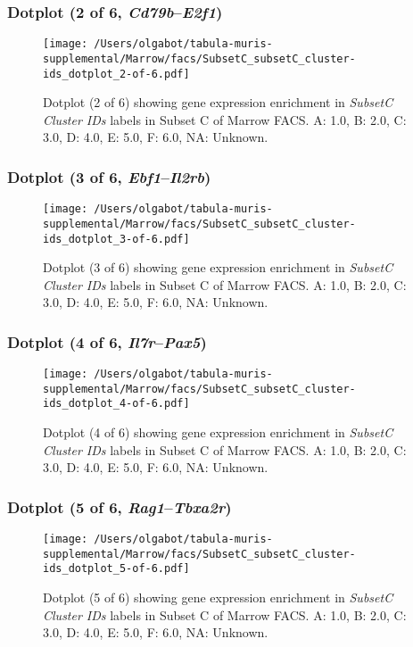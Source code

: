 \clearpage

\subsubsection{Dotplot (2 of 6, \emph{Cd79b}--\emph{E2f1})}
\begin{figure}[h]
\centering
\texttt{[image: /Users/olgabot/tabula-muris-supplemental/Marrow/facs/SubsetC\_subsetC\_cluster-ids\_dotplot\_2-of-6.pdf]}

\caption{ Dotplot (2 of 6)  showing gene expression enrichment in \emph{SubsetC Cluster IDs} labels in Subset C of Marrow FACS. A: 1.0, B: 2.0, C: 3.0, D: 4.0, E: 5.0, F: 6.0, NA: Unknown.}
\end{figure}


\clearpage

\subsubsection{Dotplot (3 of 6, \emph{Ebf1}--\emph{Il2rb})}
\begin{figure}[h]
\centering
\texttt{[image: /Users/olgabot/tabula-muris-supplemental/Marrow/facs/SubsetC\_subsetC\_cluster-ids\_dotplot\_3-of-6.pdf]}

\caption{ Dotplot (3 of 6)  showing gene expression enrichment in \emph{SubsetC Cluster IDs} labels in Subset C of Marrow FACS. A: 1.0, B: 2.0, C: 3.0, D: 4.0, E: 5.0, F: 6.0, NA: Unknown.}
\end{figure}


\clearpage

\subsubsection{Dotplot (4 of 6, \emph{Il7r}--\emph{Pax5})}
\begin{figure}[h]
\centering
\texttt{[image: /Users/olgabot/tabula-muris-supplemental/Marrow/facs/SubsetC\_subsetC\_cluster-ids\_dotplot\_4-of-6.pdf]}

\caption{ Dotplot (4 of 6)  showing gene expression enrichment in \emph{SubsetC Cluster IDs} labels in Subset C of Marrow FACS. A: 1.0, B: 2.0, C: 3.0, D: 4.0, E: 5.0, F: 6.0, NA: Unknown.}
\end{figure}


\clearpage

\subsubsection{Dotplot (5 of 6, \emph{Rag1}--\emph{Tbxa2r})}
\begin{figure}[h]
\centering
\texttt{[image: /Users/olgabot/tabula-muris-supplemental/Marrow/facs/SubsetC\_subsetC\_cluster-ids\_dotplot\_5-of-6.pdf]}

\caption{ Dotplot (5 of 6)  showing gene expression enrichment in \emph{SubsetC Cluster IDs} labels in Subset C of Marrow FACS. A: 1.0, B: 2.0, C: 3.0, D: 4.0, E: 5.0, F: 6.0, NA: Unknown.}
\end{figure}


